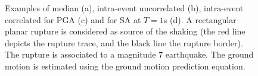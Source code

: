 \begin{figure}[htbp]
\caption{Examples of median (a), intra-event uncorrelated (b), intra-event 
correlated for PGA (c) and for SA at $T=1$s (d). A rectangular planar rupture 
is considered as source of the shaking (the red line depicts the rupture trace,
and the black line the rupture border). The rupture is associated to a 
magnitude 7 earthquake. The ground motion is estimated using the 
\citet{boore2008} ground motion prediction equation.}
\label{fig:gmfs}
\end{figure}
